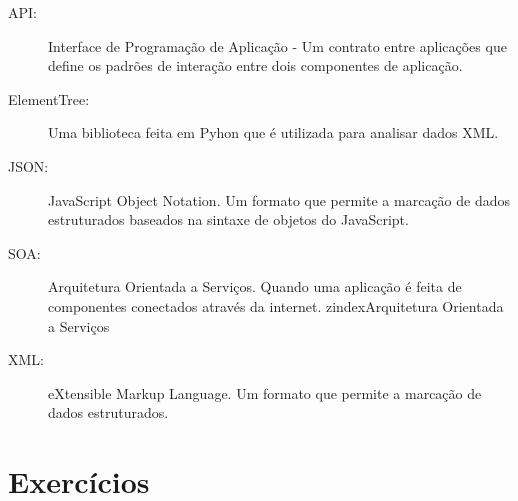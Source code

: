 \begin{description}

\item[API:] Interface de Programação de Aplicação - Um contrato entre
aplicações que define os padrões de interação entre dois componentes
de aplicação.

\item[ElementTree:] Uma biblioteca feita em Pyhon que é utilizada para
analisar dados XML.
\index[ElementTree]

\item[JSON:] JavaScript Object Notation. Um formato que permite a
marcação de dados estruturados baseados na sintaxe de objetos do
JavaScript.

\item[SOA:]  Arquitetura Orientada a Serviços. Quando uma aplicação
é feita de componentes conectados através da internet.
zindex{Arquitetura Orientada a Serviços}

\item[XML:] eXtensible Markup Language. Um formato que permite a
marcação de dados estruturados.

\end{description}

\section{Exercícios}

